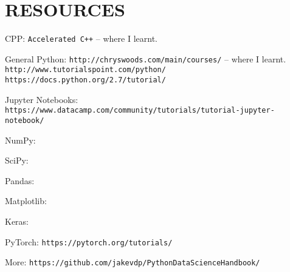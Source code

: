 \section{RESOURCES}

CPP:
\newline
\texttt{Accelerated C++} -- where I learnt.

General Python:
\newline
\texttt{http://chryswoods.com/main/courses/} -- where I learnt.
\newline
\texttt{http://www.tutorialspoint.com/python/}
\newline
\texttt{https://docs.python.org/2.7/tutorial/}

Jupyter Notebooks:
\newline
\texttt{https://www.datacamp.com/community/tutorials/tutorial-jupyter-notebook/}

NumPy:

SciPy:

Pandas:

Matplotlib:

Keras:

PyTorch:
\newline
\texttt{https://pytorch.org/tutorials/}

More:
\newline
\texttt{https://github.com/jakevdp/PythonDataScienceHandbook/}